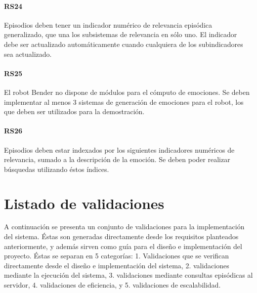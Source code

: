 \paragraph{RS24}
Episodios deben tener un indicador numérico de relevancia episódica generalizado, que una los subsistemas de relevancia en sólo uno. El indicador debe ser actualizado automáticamente cuando cualquiera de los subindicadores sea actualizado.

\paragraph{RS25}
El robot Bender no dispone de módulos para el cómputo de emociones. Se deben implementar al menos 3 sistemas de generación de emociones para el robot, los que deben ser utilizados para la demostración.

\paragraph{RS26}
Episodios deben estar indexados por los siguientes indicadores numéricos de relevancia, sumado a la descripción de la emoción. Se deben poder realizar búsquedas utilizando éstos índices.




\section{Listado de validaciones}

A continuación se presenta un conjunto de validaciones para la implementación del sistema. Éstas son generadas directamente desde los requisitos planteados anteriormente, y además sirven como guía para el diseño e implementación del proyecto. Éstas se separan en 5 categorías: 1. Validaciones que se verifican directamente desde el diseño e implementación del sistema, 2. validaciones mediante la ejecución del sistema, 3. validaciones mediante consultas episódicas al servidor, 4. validaciones de eficiencia, y 5. validaciones de escalabilidad.


